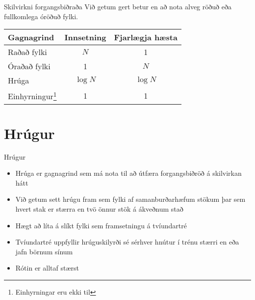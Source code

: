 \documentclass[handout]{beamer}
\begin{document}
\begin{frame}{Skilvirkni forgangsbiðraða}
	Við getum gert betur en að nota alveg röðuð eða fullkomlega óröðuð fylki.
	\begin{center}
		\begin{tabular}{lcc}
			\toprule
			Gagnagrind                                       & Innsetning & Fjarlægja hæsta \\
			\midrule
			Raðað fylki                                      & $N$        & 1               \\
			Óraðað fylki                                     & 1          & $N$             \\
			Hrúga                                            & $\log N$   & $\log N$        \\
			Einhyrningur\footnote{Einhyrningar eru ekki til} & 1          & 1               \\
			\bottomrule
		\end{tabular}
	\end{center}
\end{frame}

\section{Hrúgur}

\begin{frame}{Hrúgur}
	\begin{itemize}
		\item Hrúga er gagnagrind sem má nota til að útfæra forgangsbiðröð á skilvirkan hátt
		\item Við getum sett hrúgu fram sem fylki af samanburðarhæfum stökum þar sem hvert stak er stærra en tvö önnur stök á ákveðnum stað
		\item Hægt að líta á slíkt fylki sem framsetningu á tvíundartré 
		\item Tvíundartré uppfyllir hrúguskilyrði  sé sérhver hnútur í trénu stærri en eða jafn börnum sínum
		\item Rótin er alltaf stærst
	\end{itemize}
\end{frame}

\end{document}
